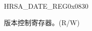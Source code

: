 \begin{register}{H}{RSA\_DATE\_REG}{0x0830}\label{regdesc:RSADATEREG}
%
%
\regnewline%
\begin{regdesc}\begin{reglist}
\label{fielddesc:RSADATE}\item [RSA\_DATE] 版本控制寄存器。(R/W)
\end{reglist}\end{regdesc}
\end{register}
